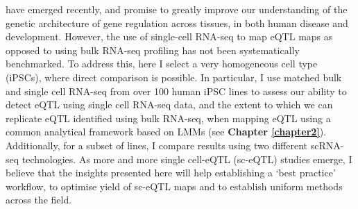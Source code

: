 have emerged recently, and promise
to greatly improve our understanding of the genetic architecture of 
gene regulation
across tissues, in both human disease and development.
However, the use of single-cell RNA-seq to map eQTL maps as opposed to using bulk RNA-seq profiling has not been systematically benchmarked.
To address this, here
I select a very homogeneous cell type (iPSCs), where direct comparison is possible.
In particular,
I use matched bulk and single cell RNA-seq from over 100 human 
iPSC lines 
to assess our ability to detect 
eQTL
using single cell RNA-seq data, and the extent to which we can replicate 
eQTL
identified using bulk RNA-seq, when mapping eQTL using a common analytical framework based on LMMs (see \textbf{Chapter 
\ref{chapter2}}).
Additionally, for a subset of lines, I compare results using two different scRNA-seq technologies.
As more and more single cell-eQTL
(sc-eQTL) studies emerge, I believe that
the insights presented here will help
establishing a `best practice' workflow, to optimise yield of sc-eQTL
maps and to establish uniform methods across the field.

\newpage

